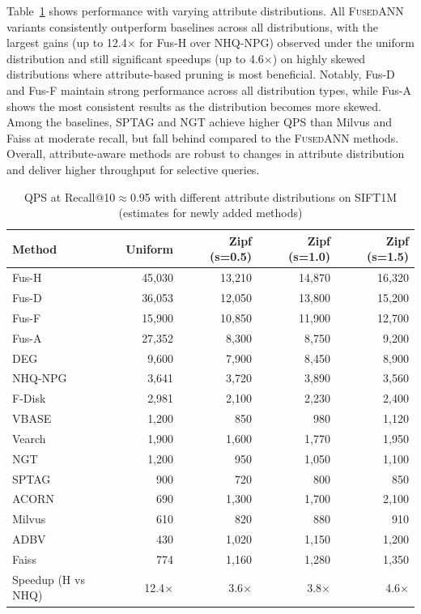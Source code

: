 \documentclass[numbers,sort]{article}
\begin{document}
Table~\ref{tab:data_distribution} shows performance with varying attribute distributions. All \textsc{FusedANN} variants consistently outperform baselines across all distributions, with the largest gains (up to 12.4$\times$ for Fus-H over NHQ-NPG) observed under the uniform distribution and still significant speedups (up to 4.6$\times$) on highly skewed distributions where attribute-based pruning is most beneficial. Notably, Fus-D and Fus-F maintain strong performance across all distribution types, while Fus-A shows the most consistent results as the distribution becomes more skewed. Among the baselines, SPTAG and NGT achieve higher QPS than Milvus and Faiss at moderate recall, but fall behind compared to the \textsc{FusedANN} methods. Overall, attribute-aware methods are robust to changes in attribute distribution and deliver higher throughput for selective queries.

\begin{table}[h]
\centering
\caption{QPS at Recall@10$\approx$0.95 with different attribute distributions on SIFT1M (estimates for newly added methods)}
\label{tab:data_distribution}
\begin{tabular}{lrrrr}
\toprule
Method    & Uniform & Zipf (s=0.5) & Zipf (s=1.0) & Zipf (s=1.5) \\
\midrule
Fus-H     & 45,030  & 13,210 & 14,870 & 16,320 \\
Fus-D     & 36,053  & 12,050 & 13,800 & 15,200 \\
Fus-F     & 15,900  & 10,850 & 11,900 & 12,700 \\
Fus-A     & 27,352  & 8,300  & 8,750  & 9,200  \\
DEG       & 9,600   & 7,900  & 8,450  & 8,900  \\
NHQ-NPG   & 3,641   & 3,720  & 3,890  & 3,560  \\
F-Disk    & 2,981   & 2,100  & 2,230  & 2,400  \\
VBASE     & 1,200   & 850  & 980  & 1,120  \\
Vearch    & 1,900   & 1,600  & 1,770  & 1,950  \\
NGT       & 1,200   & 950    & 1,050  & 1,100  \\
SPTAG     & 900     & 720    & 800    & 850    \\
ACORN     & 690   & 1,300  & 1,700  & 2,100  \\
Milvus    & 610      & 820    & 880    & 910    \\
ADBV      & 430      & 1,020  & 1,150  & 1,200  \\
Faiss     & 774     & 1,160  & 1,280  & 1,350  \\
\midrule
Speedup (H vs NHQ) & 12.4$\times$ & 3.6$\times$ & 3.8$\times$ & 4.6$\times$ \\
\bottomrule
\end{tabular}
\end{table}
\end{document}
